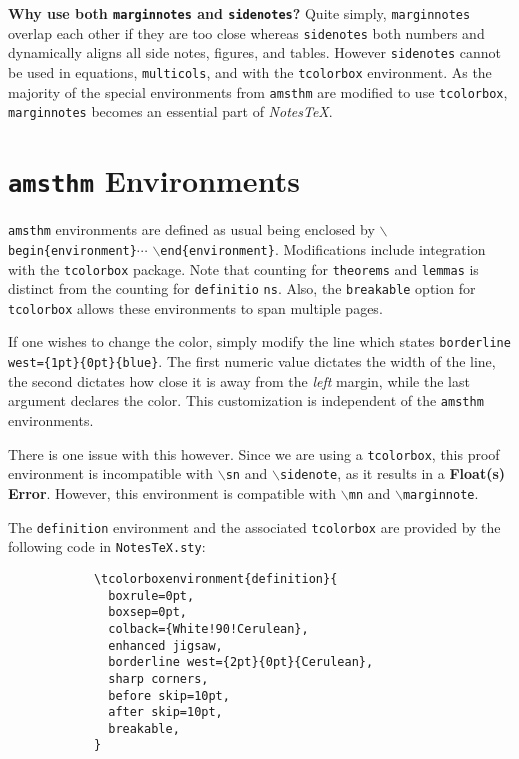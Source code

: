 \documentclass[10pt]{article}
\begin{document}
	\begin{remark}\textbf{Why use both \texttt{marginnotes} and \texttt{sidenotes}?}
		Quite simply, \texttt{marginnotes} overlap each other if they are too close whereas \texttt{sidenotes} both numbers and dynamically aligns all side notes, figures, and tables. However \texttt{sidenotes} cannot be used in equations, \texttt{multicols}, and with the \texttt{tcolorbox} environment. As the majority of the special environments from \texttt{amsthm} are modified to use \texttt{tcolorbox}, \texttt{marginnotes} becomes an essential part of \textit{NotesTeX}.
	\end{remark}
	

	\section{\texttt{amsthm} Environments}\label{Sub:Special}
	\texttt{amsthm} environments are defined as usual being enclosed by \texttt{$\backslash$begin\{environment\}}$\cdots$ \texttt{$\backslash$end\{environment\}}. Modifications include integration with the \texttt{tcolorbox} package. Note that counting for \texttt{theorems} and \texttt{lemmas} is distinct from the counting for \texttt{definitio} \texttt{ns}. Also, the \texttt{breakable} option for \texttt{tcolorbox} allows these environments to span multiple pages.

	If one wishes to change the color, simply modify the line which states \texttt{borderline west=\{1pt\}}\texttt{\{0pt\}\{blue\}}. The first numeric value dictates the width of the line, the second dictates how close it is away from the \textit{left} margin, while the last argument declares the color. This customization is independent of the \texttt{amsthm} environments.

	There is one issue with this however. Since we are using a \texttt{tcolorbox}, this proof environment is incompatible with \texttt{$\backslash$sn} and \texttt{$\backslash$sidenote}, as it results in a \textbf{Float(s) Error}. However, this environment is compatible with \texttt{$\backslash$mn} and \texttt{$\backslash$marginnote}.

	\begin{definition}
		The \texttt{definition} environment and the associated \texttt{tcolorbox} are provided by the following code in \texttt{NotesTeX.sty}:
		\begin{verbatim}
			\tcolorboxenvironment{definition}{
			  boxrule=0pt,
			  boxsep=0pt,
			  colback={White!90!Cerulean},
			  enhanced jigsaw, 
			  borderline west={2pt}{0pt}{Cerulean},
			  sharp corners,
			  before skip=10pt,
			  after skip=10pt,
			  breakable,
			}
		\end{verbatim}
	\end{definition}
\end{document}
